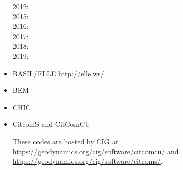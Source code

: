 \begin{itemize}
\noindent
{\small
2012: \cite{krhb12}\\
2015: \cite{aupm15}\cite{tosn15}\\
2016: \cite{dahe16}\cite{gadb16}\cite{zhon16}\\
2017: \cite{hepb17}\cite{daef17}\cite{hedg17}\cite{robh17}\cite{robu17}\cite{aumh17}
      \cite{thie17}\cite{brsg17}\cite{onmz17}\cite{tasm17}\cite{zhli17}\\
2018: \cite{daga18}\cite{onzh18}\cite{gltf18}\cite{heps18}\cite{galh18}\cite{peka18}
      \cite{puth18}\cite{brst18b}\\
2019: \cite{baba19}\cite{stbl19}\cite{cocf19}\cite{liki19}\cite{galb19}\cite{dagg19}
      \cite{njas19}\cite{sepg19}
}

\item {\codefont BASIL/ELLE} \url{http://elle.ws/}

{\small
\cite{bokj08}
\cite{llor19}
}

\item {\codefont BEM}   

{\small
\cite{crsr83}
\cite{katl95}
\cite{moct07}
\cite{moct09}
\cite{moyb10}
\cite{qumm12}\cite{buqm12}
\cite{quhm13}
\cite{gert19}
}

\item {\codefont CHIC}  

\cite{norv15}

\item {\codefont CitcomS} and {\codefont CitComCU} 

These codes are hosted by CIG at \url{https://geodynamics.org/cig/software/citcomcu/}
and \url{https://geodynamics.org/cig/software/citcoms/}.


\end{itemize}
